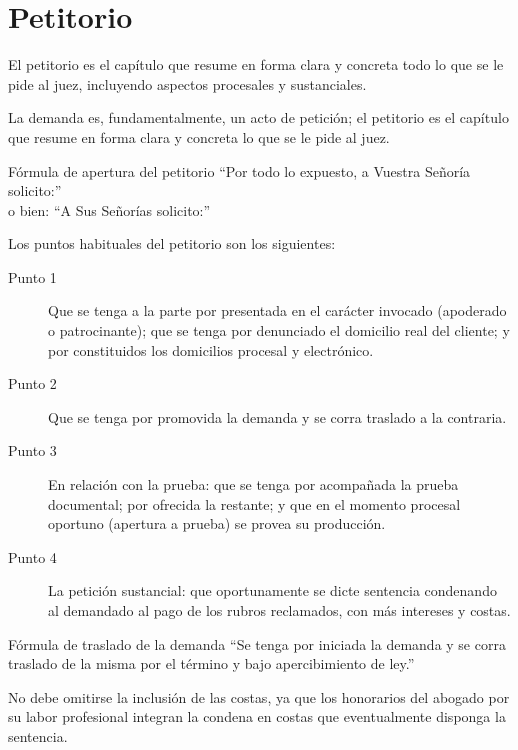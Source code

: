 \documentclass[12pt,oneside]{book}
\begin{document}
\chapter{Petitorio}

El petitorio es el capítulo que resume en forma clara y concreta todo lo que se le pide al juez, incluyendo aspectos procesales y sustanciales.

\begin{important}
La demanda es, fundamentalmente, un acto de petición; el petitorio es el capítulo que resume en forma clara y concreta lo que se le pide al juez.
\end{important}

\begin{example}{Fórmula de apertura del petitorio}
``Por todo lo expuesto, a Vuestra Señoría solicito:'' \\
o bien: ``A Sus Señorías solicito:''
\end{example}

Los puntos habituales del petitorio son los siguientes:

\begin{description}
    \item[Punto 1] Que se tenga a la parte por presentada en el carácter invocado (apoderado o patrocinante); que se tenga por denunciado el domicilio real del cliente; y por constituidos los domicilios procesal y electrónico.
    \item[Punto 2] Que se tenga por promovida la demanda y se corra traslado a la contraria.
    \item[Punto 3] En relación con la prueba: que se tenga por acompañada la prueba documental; por ofrecida la restante; y que en el momento procesal oportuno (apertura a prueba) se provea su producción.
    \item[Punto 4] La petición sustancial: que oportunamente se dicte sentencia condenando al demandado al pago de los rubros reclamados, con más intereses y costas.
\end{description}

\begin{example}{Fórmula de traslado de la demanda}
``Se tenga por iniciada la demanda y se corra traslado de la misma por el término y bajo apercibimiento de ley.''
\end{example}

\begin{important}
No debe omitirse la inclusión de las costas, ya que los honorarios del abogado por su labor profesional integran la condena en costas que eventualmente disponga la sentencia.
\end{important}
\end{document}
